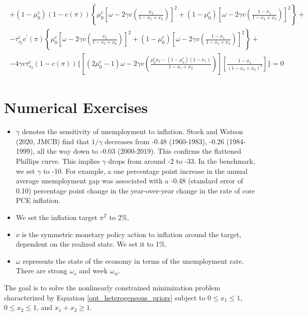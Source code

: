 \documentclass[12pt,a4paper]{article}
\begin{document}
\begin{small}
\begin{eqnarray}
\begin{split}
        +(1-\mu_0^c)(1-c(\pi))\left\{\mu_0^c\left[\omega-2\gamma v\left(\frac{x_2}{1-x_1+x_2}\right)\right]^2+(1-\mu_0^c)\left[\omega-2\gamma v\left(\frac{1-x_1}{1-x_1+x_2}\right)\right]^2\right\}+\\
        -\tau_{s_2}^cc^\prime(\pi)\left\{\mu_0^c\left[\omega-2\gamma v\left(\frac{x_2}{1-x_1+x_2}\right)\right]^2+(1-\mu_0^c)\left[\omega-2\gamma v\left(\frac{1-x_1}{1-x_1+x_2}\right)\right]^2\right\}+\\
        -4\gamma v\tau_{s_2}^c(1-c(\pi))\Bigg\{\left[(2\mu_0^c-1)\omega-2\gamma v\left(\frac{\mu_0^cx_2-(1-\mu_0^c)(1-x_1)}{1-x_1+x_2}\right)\right]\left[\frac{1-x_1}{(1-x_1+x_2)^2}\right]\Bigg\}=0
    \end{split}
\end{eqnarray}
\end{small}

\section{Numerical Exercises}
\begin{itemize}
    \item $\gamma$ denotes the sensitivity of unemployment to inflation. Stock and Watson (2020, JMCB) find that $1/\gamma$ decreases from -0.48 (1960-1983), -0.26 (1984-1999), all the way down to -0.03 (2000-2019). This confirms the flattened Phillips curve. This implies $\gamma$ drops from around -2 to -33. In the benchmark, we set $\gamma$ to -10. For example, a one percentage point increase in the annual average unemployment gap was associated with a -0.48 (standard error of 0.10) percentage point change in the year-over-year change in the rate of core PCE inflation.
    \item We set the inflation target $\pi^T$ to 2\%. 
    \item $\nu$ is the symmetric monetary policy action to inflation around the target, dependent on the realized state. We set it to 1\%.
    \item $\omega$ represents the state of the economy in terms of the unemployment rate. There are strong $\omega_s$ and week $\omega_w$.
\end{itemize}

The goal is to solve the nonlinearly constrained minimization problem characterized by Equation \eqref{opt_heterogeneous_priors} subject to $0 \leq x_1 \leq 1$, $0 \leq x_2 \leq 1$, and $x_1+x_2 \geq 1$.

\end{document}
